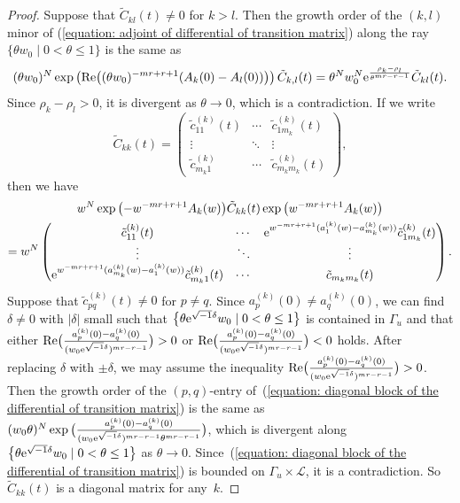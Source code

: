 \documentclass[pdftex]{sigma}
\numberwithin{equation}{section}
\begin{document}
\begin{proof}
Suppose that
$\tilde{C}_{kl}(t)\neq 0$ for $k>l$.
Then the growth order of the $(k,l)$ minor of (\ref{equation: adjoint of differential of transition matrix})
along the ray $\{ \theta w_0 \mid 0<\theta\leq 1\}$
is the same as
\[
 (\theta w_0)^N\exp \left( \mathrm{Re}
 \big( (\theta w_0)^{-mr+r+1}(A_k(0)-A_l(0)) \big) \right) \tilde{C}_{k,l}(t)
 =\theta^N w_0^N {\rm e}^{\frac{\rho_k-\rho_l}{\theta^{mr-r-1}}}
 \tilde{C}_{kl}(t).
\]
Since $\rho_k-\rho_l>0$, it is divergent as $\theta\to 0$, which is a contradiction.
If we write
\[
 \tilde{C}_{kk}(t)=
 \begin{pmatrix}
 \tilde{c}^{(k)}_{11}(t) & \cdots & \tilde{c}^{(k)}_{1m_k}(t) \\
 \vdots & \ddots & \vdots \\
 \tilde{c}^{(k)}_{m_k1} & \cdots & \tilde{c}^{(k)}_{m_km_k}(t)
 \end{pmatrix},
\]
then we have
\begin{gather}
 w^N\exp\big({-}w^{-mr+r+1}A_k(w)\big)\tilde{C}_{kk}(t)\exp\big(w^{-mr+r+1}A_k(w)\big)
\nonumber \\
 =
 w^N
 \begin{pmatrix}
 \tilde{c}^{(k)}_{11}(t) & \cdots &
 {\rm e}^{w^{-mr+r+1} (a^{(k)}_1(w)-a^{(k)}_{m_k}(w)) } \tilde{c}^{(k)}_{1m_k}(t)
 \\
 \vdots & \ddots & \vdots \\
 {\rm e}^{w^{-mr+r+1} (a^{(k)}_{m_k}(w)-a^{(k)}_1(w)) } \tilde{c}^{(k)}_{m_k1}(t)
 & \cdots & \tilde{c}_{m_km_k}(t)
 \end{pmatrix}.\label{equation: diagonal block of the differential of transition matrix}
\end{gather}
Suppose that $\tilde{c}^{(k)}_{pq}(t)\neq 0$ for $p\neq q$.
Since $a^{(k)}_p(0)\neq a^{(k)}_q(0)$,
we can find $\delta\neq 0$ with
$|\delta|$ small such that
$\big\{ \theta {\rm e}^{\sqrt{-1}\delta} w_0 \mid 0<\theta \leq 1 \big\}$
is contained in $\Gamma_u$
and that either
$\mathrm{Re}\big( \frac {a^{(k)}_p(0)-a^{(k)}_q(0)}
{(w_0{\rm e}^{\sqrt{-1}\delta})^{mr-r-1}} \big)>0$
or
$\mathrm{Re}\big( \frac {a^{(k)}_p(0)-a^{(k)}_q(0)}
{(w_0{\rm e}^{\sqrt{-1}\delta})^{mr-r-1}} \big)<0$ holds.
After replacing $\delta$ with $\pm\delta$, we may assume the inequality
$\mathrm{Re}\big( \frac {a^{(k)}_p(0)-a^{(k)}_q(0)}
{(w_0{\rm e}^{\sqrt{-1}\delta})^{mr-r-1}} \big)>0$.
Then the growth order of the $(p,q)$-entry of~(\ref{equation: diagonal block of the differential of transition matrix})
is the same as
$(w_0\theta)^N \exp\big( \frac {a^{(k)}_p(0)-a^{(k)}_q(0)}
{(w_0{\rm e}^{\sqrt{-1}\delta})^{mr-r-1}\theta^{mr-r-1}} \big)$,
which is divergent along
$\big\{ \theta {\rm e}^{\sqrt{-1}\delta} w_0 \mid 0<\theta \leq 1 \big\}$
as $\theta\to 0$.
Since~(\ref{equation: diagonal block of the differential of transition matrix})
is bounded on $\Gamma_u\times{\mathcal L}$, it is a contradiction.
So $\tilde{C}_{kk}(t)$ is a diagonal matrix for any~$k$.


\end{proof}
\end{document}
